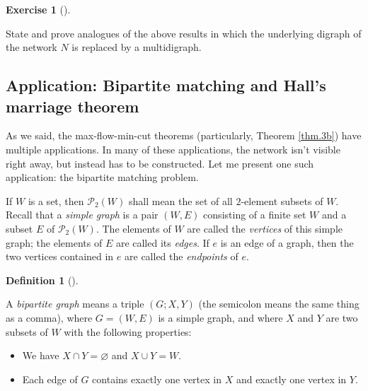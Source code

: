 \documentclass[numbers=enddot,12pt,final,onecolumn,notitlepage]{scrartcl}%
\newcounter{exer}
\theoremstyle{definition}
\newtheorem{defi}[theo]{Definition}
\newenvironment{definition}[1][]
{\begin{defi}[#1]\begin{leftbar}}
{\end{leftbar}\end{defi}}
\newtheorem{exmp}[exer]{Exercise}
\newenvironment{exercise}[1][]
{\begin{exmp}[#1]\begin{leftbar}}
{\end{leftbar}\end{exmp}}
\begin{document}
\begin{exercise}
State and prove analogues of the above results in which the underlying digraph
of the network $N$ is replaced by a multidigraph.
\end{exercise}

\subsection{\label{sect.hall}Application: Bipartite matching and Hall's
marriage theorem}

As we said, the max-flow-min-cut theorems (particularly, Theorem \ref{thm.3b})
have multiple applications. In many of these applications, the network isn't
visible right away, but instead has to be constructed. Let me present one such
application: the bipartite matching problem.

If $W$ is a set, then $\mathcal{P}_{2}\left(  W\right)  $ shall mean the set
of all $2$-element subsets of $W$. Recall that a \textit{simple graph} is a
pair $\left(  W,E\right)  $ consisting of a finite set $W$ and a subset $E$ of
$\mathcal{P}_{2}\left(  W\right)  $. The elements of $W$ are called the
\textit{vertices} of this simple graph; the elements of $E$ are called its
\textit{edges}. If $e$ is an edge of a graph, then the two vertices contained
in $e$ are called the \textit{endpoints} of $e$.

\begin{definition}
\label{def.bipgraph}A \textit{bipartite graph} means a triple $\left(
G;X,Y\right)  $ (the semicolon means the same thing as a comma), where
$G=\left(  W,E\right)  $ is a simple graph, and where $X$ and $Y$ are two
subsets of $W$ with the following properties:

\begin{itemize}
\item We have $X\cap Y=\varnothing$ and $X\cup Y=W$.

\item Each edge of $G$ contains exactly one vertex in $X$ and exactly one
vertex in $Y$.
\end{itemize}
\end{definition}
\end{document}
